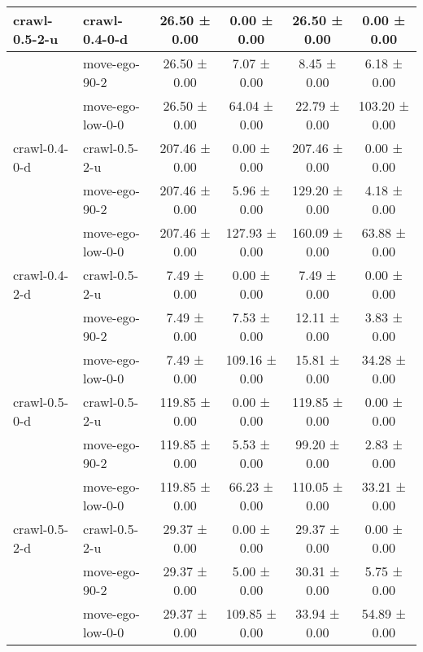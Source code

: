 \begin{tabular}{|l|l|c|c|c|c|}
\hline
crawl-0.5-2-u & crawl-0.4-0-d & 26.50 ± 0.00 & 0.00 ± 0.00 & 26.50 ± 0.00 & 0.00 ± 0.00 \\
\hline
 & move-ego-90-2 & 26.50 ± 0.00 & 7.07 ± 0.00 & 8.45 ± 0.00 & 6.18 ± 0.00 \\
\hline
 & move-ego-low-0-0 & 26.50 ± 0.00 & 64.04 ± 0.00 & 22.79 ± 0.00 & 103.20 ± 0.00 \\
\hline
crawl-0.4-0-d & crawl-0.5-2-u & 207.46 ± 0.00 & 0.00 ± 0.00 & 207.46 ± 0.00 & 0.00 ± 0.00 \\
\hline
 & move-ego-90-2 & 207.46 ± 0.00 & 5.96 ± 0.00 & 129.20 ± 0.00 & 4.18 ± 0.00 \\
\hline
 & move-ego-low-0-0 & 207.46 ± 0.00 & 127.93 ± 0.00 & 160.09 ± 0.00 & 63.88 ± 0.00 \\
\hline
crawl-0.4-2-d & crawl-0.5-2-u & 7.49 ± 0.00 & 0.00 ± 0.00 & 7.49 ± 0.00 & 0.00 ± 0.00 \\
\hline
 & move-ego-90-2 & 7.49 ± 0.00 & 7.53 ± 0.00 & 12.11 ± 0.00 & 3.83 ± 0.00 \\
\hline
 & move-ego-low-0-0 & 7.49 ± 0.00 & 109.16 ± 0.00 & 15.81 ± 0.00 & 34.28 ± 0.00 \\
\hline
crawl-0.5-0-d & crawl-0.5-2-u & 119.85 ± 0.00 & 0.00 ± 0.00 & 119.85 ± 0.00 & 0.00 ± 0.00 \\
\hline
 & move-ego-90-2 & 119.85 ± 0.00 & 5.53 ± 0.00 & 99.20 ± 0.00 & 2.83 ± 0.00 \\
\hline
 & move-ego-low-0-0 & 119.85 ± 0.00 & 66.23 ± 0.00 & 110.05 ± 0.00 & 33.21 ± 0.00 \\
\hline
crawl-0.5-2-d & crawl-0.5-2-u & 29.37 ± 0.00 & 0.00 ± 0.00 & 29.37 ± 0.00 & 0.00 ± 0.00 \\
\hline
 & move-ego-90-2 & 29.37 ± 0.00 & 5.00 ± 0.00 & 30.31 ± 0.00 & 5.75 ± 0.00 \\
\hline
 & move-ego-low-0-0 & 29.37 ± 0.00 & 109.85 ± 0.00 & 33.94 ± 0.00 & 54.89 ± 0.00 \\
\hline
\end{tabular}